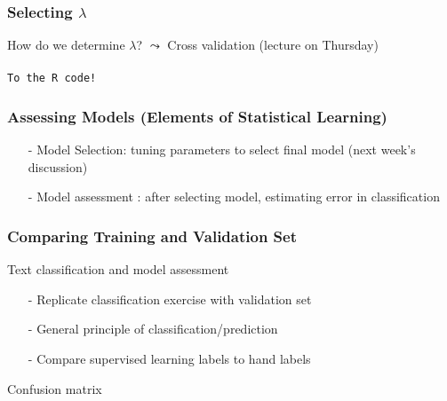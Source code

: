 \documentclass{beamer}
\begin{document}
\begin{frame}
\frametitle{Selecting $\lambda$}

How do we determine $\lambda$? $\leadsto$ Cross validation (lecture on Thursday) \pause \\
 \pause \\

{\tt To the R code!}

\end{frame}


\begin{frame}
\frametitle{Assessing Models (Elements of Statistical Learning) } 


\begin{itemize}
\item[-] \alert{Model Selection}: tuning parameters to select final model (next week's discussion)
\item[-] \alert{Model assessment} : after selecting model, estimating error in classification
\end{itemize}


\end{frame}


\begin{frame}
\frametitle{Comparing Training and Validation Set} 

Text classification and model assessment 
\begin{itemize}
\item[-] \alert{Replicate} classification exercise with \alert{validation} set
\item[-] General \alert{principle} of classification/prediction
\item[-] Compare supervised learning labels to hand labels
\end{itemize}

\alert{Confusion matrix} 


\end{frame}
\end{document}
